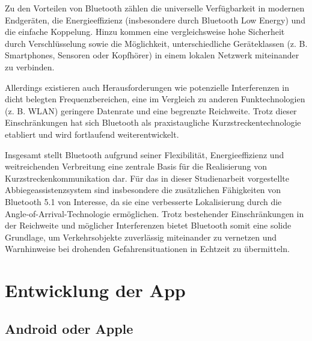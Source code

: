 \documentclass[a4paper, 12pt]{article} %
\begin{document}
\begin{spacing}{1.8}  %
\fontsize{14pt}{15pt}\selectfont  %

Zu den Vorteilen von Bluetooth zählen die universelle Verfügbarkeit in modernen Endgeräten, die Energieeffizienz (insbesondere durch Bluetooth Low Energy) und die einfache Koppelung. Hinzu kommen eine vergleichsweise hohe Sicherheit durch Verschlüsselung sowie die Möglichkeit, unterschiedliche Geräteklassen (z. B. Smartphones, Sensoren oder Kopfhörer) in einem lokalen Netzwerk miteinander zu verbinden.

Allerdings existieren auch Herausforderungen wie potenzielle Interferenzen in dicht belegten Frequenzbereichen, eine im Vergleich zu anderen Funktechnologien (z. B. WLAN) geringere Datenrate und eine begrenzte Reichweite. Trotz dieser Einschränkungen hat sich Bluetooth als praxistaugliche Kurzstreckentechnologie etabliert und wird fortlaufend weiterentwickelt.

Insgesamt stellt Bluetooth aufgrund seiner Flexibilität, Energieeffizienz und weitreichenden Verbreitung eine zentrale Basis für die Realisierung von Kurzstreckenkommunikation dar. Für das in dieser Studienarbeit vorgestellte Abbiegeassistenzsystem sind insbesondere die zusätzlichen Fähigkeiten von Bluetooth 5.1 von Interesse, da sie eine verbesserte Lokalisierung durch die Angle-of-Arrival-Technologie ermöglichen. Trotz bestehender Einschränkungen in der Reichweite und möglicher Interferenzen bietet Bluetooth somit eine solide Grundlage, um Verkehrsobjekte zuverlässig miteinander zu vernetzen und Warnhinweise bei drohenden
 Gefahrensituationen in Echtzeit zu übermitteln.
\end{spacing}


\clearpage

\section{Entwicklung der App}

\subsection{Android oder Apple}
\end{document}
